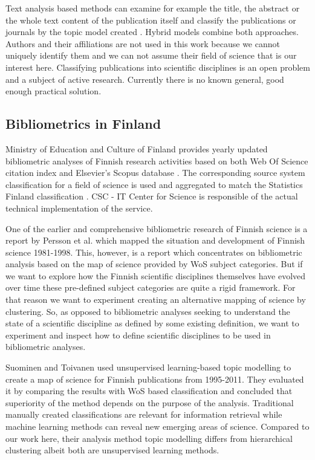 Text analysis based methods can examine for example the title, the 
abstract or the whole text content of the publication itself and 
classify the publications or journals by the topic model created 
\cite{blei_latent_2003}.
Hybrid models combine both approaches. 
Authors and their affiliations are not used in this work because 
we cannot uniquely identify them and we can not assume their field 
of science that is our interest here.
Classifying publications into scientific disciplines is an open
problem and a subject of active research. Currently there is no 
known general, good enough practical solution.


\subsection{Bibliometrics in Finland}
Ministry of Education and Culture of Finland provides yearly
updated bibliometric analyses of Finnish research activities 
based on both Web Of Science citation index 
and Elsevier's Scopus database \cite[Vipunen 
service]{noauthor_ministry_2020}. The corresponding source 
system classification for a field of science is used and
aggregated to match the Statistics Finland classification 
\cite{auranen_tieteen_2018}. CSC - 
IT Center for Science is responsible of the actual technical 
implementation of the service.

One of the earlier and comprehensive bibliometric research of 
Finnish science is a report by Persson et al. 
\cite{persson_bibliometric_2000} which mapped the situation and 
development of Finnish science 1981-1998.
This, however, is a report which concentrates on bibliometric 
analysis based on the map of science provided by WoS subject 
categories. But if we want to explore how the Finnish scientific 
disciplines themselves have evolved over time these pre-defined 
subject categories are quite a rigid framework. For that reason we 
want to experiment creating an alternative mapping of science by 
clustering. 
So, as opposed to bibliometric analyses seeking to understand the
state of a scientific discipline as defined by some existing 
definition, we want to experiment and inspect how to define 
scientific disciplines to be used in bibliometric analyses.


Suominen and Toivanen \cite{suominen_map_2016} used unsupervised learning-based topic 
modelling to create a map of science for Finnish publications from 
1995-2011. They evaluated it by comparing the results with WoS 
based classification and concluded that superiority of the method
depends on the purpose of the analysis. Traditional manually created 
classifications are relevant for information retrieval while 
machine learning methods can reveal new emerging areas of science.
Compared to our work here, their 
analysis method topic modelling differs from hierarchical 
clustering albeit both are unsupervised learning methods.

